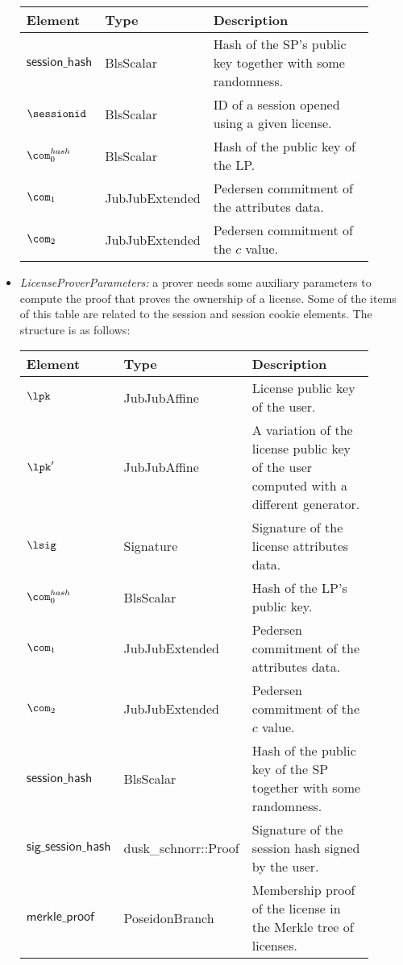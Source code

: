 \begin{itemize}
	\vspace{0.1cm}
	\begin{center}
		\begin{tabular}{ | p{0.15\linewidth} | p{0.2\linewidth} | p{0.55\linewidth} | } 
			\hline
			{Element} & {Type} & {Description} \\
			\hline
			$\mathsf{session\_hash}$ & BlsScalar & Hash of the SP's public key together with some randomness. \\ 
			$\sessionid$ & BlsScalar & ID of a session opened using a given license. \\ 
			$\com_0^{hash}$ & BlsScalar & Hash of the public key of the LP. \\ 
			$\com_1$ & JubJubExtended & Pedersen commitment of the attributes data. \\ 
			$\com_2$ & JubJubExtended & Pedersen commitment of the $c$ value. \\ 
			\hline
		\end{tabular}
	\end{center}
	
    \item \emph{LicenseProverParameters:} a prover needs some auxiliary parameters to compute the proof that proves the ownership of a license. Some of the items of this table are related to the session and session cookie elements. The structure is as follows:

		
	\vspace{0.1cm}
	\begin{center}
		\begin{tabular}{ | p{0.15\linewidth} | p{0.2\linewidth} | p{0.55\linewidth} | } 
			\hline
			{Element} & {Type} & {Description} \\
			\hline
			$\lpk$ & JubJubAffine & License public key of the user.\\ 
			$\lpk'$ & JubJubAffine & A variation of the license public key of the user computed with a different generator.\\ 
			$\lsig$ & Signature & Signature of the license attributes data. \\ 
			$\com_0^{hash}$ & BlsScalar & Hash of the LP's public key. \\ 
			$\com_1$ & JubJubExtended & Pedersen commitment of the attributes data. \\ 
			$\com_2$ & JubJubExtended & Pedersen commitment of the $c$ value. \\ 
			$\mathsf{session\_hash}$ & BlsScalar & Hash of the public key of the SP together with some randomness. \\ 
			$\mathsf{sig\_session\_hash}$ & dusk\_schnorr::Proof & Signature of the session hash signed by the user. \\ 
			$\mathsf{merkle\_proof}$ & PoseidonBranch & Membership proof of the license in the Merkle tree of licenses. \\ 
			
			\hline
		\end{tabular}
	\end{center}
		
\end{itemize}
